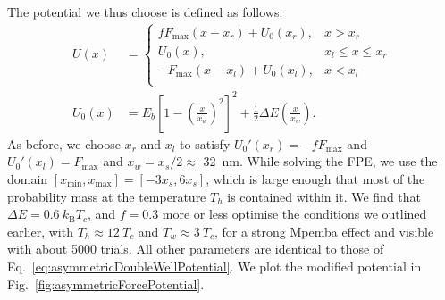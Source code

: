 \documentclass[hyperref={colorlinks=true, urlcolor=blue, citecolor=blue, final, bound}]{sfuthesis}
\newcommand{\kB}{k_{\mathrm{B}}}
\begin{document}
The potential we thus choose is defined as follows:
\begin{align}
    U(x) &= \begin{cases}
        fF_{\max}(x-x_r)+U_0(x_r),& x > x_r\\
        U_0(x),& x_l \leq x \leq x_r\\
        -F_{\max}(x-x_l)+U_0(x_l),& x < x_l\\
    \end{cases}\\
    U_0(x) &= E_b\left[ 1-\left( \frac{x}{x_w} \right)^2 \right]^2 + \frac 12 \Delta E\left( \frac{x}{x_w} \right).\label{eq:asymmetricSlopesDoubleWellPotential}
\end{align}
As before, we choose $x_r$ and $x_l$ to satisfy $U_0'(x_r)=-fF_{\max}$ and $U_0'(x_l)=F_{\max}$ and $x_w=x_s/2\approx$ \qty{32}{\nano\metre}. While solving the FPE, we use the domain $[x_{\min},x_{\max}]=[-3x_s, 6x_s]$, which is large enough that most of the probability mass at the temperature $T_h$ is contained within it. We find that $\Delta E=0.6~\kB T_c$, and $f=0.3$ more or less optimise the conditions we outlined earlier, with $T_h\approx 12~T_c$ and $T_w\approx 3~T_c$, for a strong Mpemba effect and visible with about \num{5000} trials. All other parameters are identical to those of Eq.~\ref{eq:asymmetricDoubleWellPotential}. We plot the modified potential in Fig.~\ref{fig:asymmetricForcePotential}. 

\end{document}
